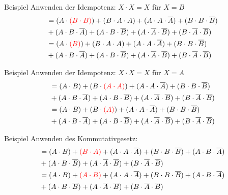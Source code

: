 \documentclass[12pt%
,aspectratio=169%
]{beamer}
\begin{document}
\begin{frame}{Beispiel}
Anwenden der Idempotenz: $X \cdot X = X$ für $X=B$
\begin{align*}
&= (A \cdot \textcolor{red}{(B \cdot B)}) + (B \cdot A \cdot A) + (A \cdot A \cdot \overline{A}) + (B \cdot B \cdot \overline{B}) \\
&+ (A \cdot B \cdot \overline{A}) + (A \cdot B \cdot \overline{B}) + (A \cdot \overline{A} \cdot \overline{B}) + (B \cdot \overline{A} \cdot \overline{B})\\
&= (A \cdot \textcolor{red}{(B)}) + (B \cdot A \cdot A) + (A \cdot A \cdot \overline{A}) + (B \cdot B \cdot \overline{B}) \\
&+ (A \cdot B \cdot \overline{A}) + (A \cdot B \cdot \overline{B}) + (A \cdot \overline{A} \cdot \overline{B}) + (B \cdot \overline{A} \cdot \overline{B})
\end{align*}
\end{frame}

\begin{frame}{Beispiel}
Anwenden der Idempotenz: $X \cdot X = X$ für $X=A$
\begin{align*}
&= (A \cdot B) + (B \cdot \textcolor{red}{(A \cdot A)}) + (A \cdot A \cdot \overline{A}) + (B \cdot B \cdot \overline{B}) \\
&+ (A \cdot B \cdot \overline{A}) + (A \cdot B \cdot \overline{B}) + (A \cdot \overline{A} \cdot \overline{B}) + (B \cdot \overline{A} \cdot \overline{B})\\
&= (A \cdot B) + (B \cdot \textcolor{red}{(A)}) + (A \cdot A \cdot \overline{A}) + (B \cdot B \cdot \overline{B}) \\
&+ (A \cdot B \cdot \overline{A}) + (A \cdot B \cdot \overline{B}) + (A \cdot \overline{A} \cdot \overline{B}) + (B \cdot \overline{A} \cdot \overline{B})
\end{align*}
\end{frame}

\begin{frame}{Beispiel}
Anwenden des Kommutativgesetz:
\begin{align*}
&= (A \cdot B) + \textcolor{red}{(B \cdot A)} + (A \cdot A \cdot \overline{A}) + (B \cdot B \cdot \overline{B}) + (A \cdot B \cdot \overline{A})\\
&+ (A \cdot B \cdot \overline{B}) + (A \cdot \overline{A} \cdot \overline{B}) + (B \cdot \overline{A} \cdot \overline{B})\\
&= (A \cdot B) + \textcolor{red}{(A \cdot B)} + (A \cdot A \cdot \overline{A}) + (B \cdot B \cdot \overline{B}) + (A \cdot B \cdot \overline{A})\\
& + (A \cdot B \cdot \overline{B}) + (A \cdot \overline{A} \cdot \overline{B}) + (B \cdot \overline{A} \cdot \overline{B})
\end{align*}
\end{frame}
\end{document}
